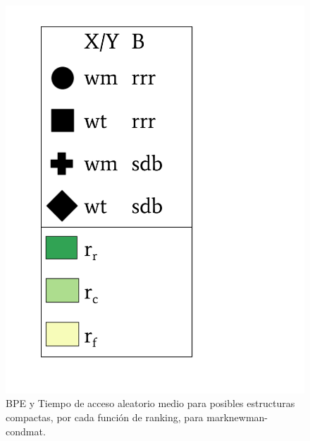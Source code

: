 \begin{frame}
\begin{figure}
\begin{minipage}{1\textwidth}
\begin{minipage}{0.15\textwidth}
    			\includegraphics[scale=.15, clip, trim=70 0 0 0]{../img/sdsl/label.pdf}
    		\end{minipage}	
    	\end{minipage}

	\caption{BPE y Tiempo de acceso aleatorio medio para posibles estructuras compactas, por cada función de ranking, para marknewman-condmat.}
\end{figure}

\end{frame}

